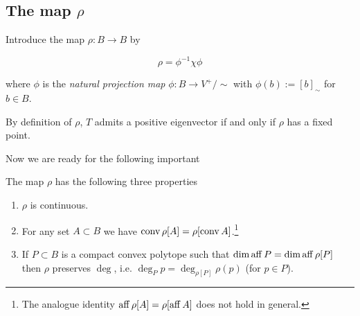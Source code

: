 \documentclass{article}
\begin{document}
\subsection{The map $\rho$}

\begin{definition}
Introduce the map $\rho:B\to B$ by

\begin{equation}
\rho=\phi^{-1}\chi\phi
\end{equation}

where $\phi$ is the \emph{natural projection map} $\phi:B\to V^+/\sim$ with $\phi(b):=[b]_\sim$ for $b\in B$.
\end{definition}

\begin{remark}
By definition of $\rho$, $T$ admits a positive eigenvector if and only if $\rho$ has a fixed point.
\end{remark}

Now we are ready for the following important

\begin{lemma}\label{lem2}
The map $\rho$ has the following three properties
\begin{enumerate}
\item $\rho$ is continuous.
\item For any set $A\subset B$ we have $\operatorname{conv}\rho[A]=\rho[\operatorname{conv}{A}]$.\footnote{The analogue identity $\operatorname{aff}\rho[A]=\rho[\operatorname{aff}{A}]$ does not hold in general.}
\item If $P\subset B$ is a compact convex polytope such that $\dim\operatorname{aff}{P} = \dim\operatorname{aff}\rho[P]$ then $\rho$ preserves $\deg$, i.e. $\deg_P{p} = \deg_{\rho[P]}\rho(p)$ (for $p\in P$).
\end{enumerate}
\end{lemma}
\end{document}
